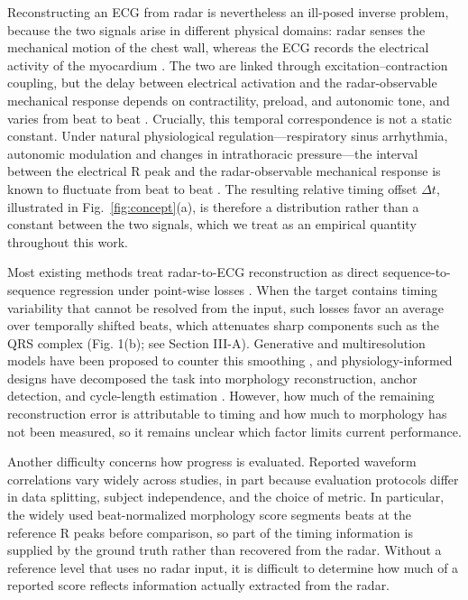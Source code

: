 \documentclass[lettersize,journal]{IEEEtran}
\begin{document}
Reconstructing an ECG from radar is nevertheless an ill-posed inverse problem, because the two signals arise in different physical domains: radar senses the mechanical motion of the chest wall, whereas the ECG records the electrical activity of the myocardium \cite{chenmmwave,radarode}. The two are linked through excitation–contraction coupling, but the delay between electrical activation and the radar-observable mechanical response depends on contractility, preload, and autonomic tone, and varies from beat to beat \cite{michael2017sti}. Crucially, this temporal correspondence is not a static constant. Under natural physiological regulation---respiratory sinus arrhythmia, autonomic modulation and changes in intrathoracic pressure---the interval between the electrical R peak and the radar-observable mechanical response is known to fluctuate from beat to beat \cite{draghici2016hrv,michael2017sti}. The resulting relative timing offset $\Delta t$, illustrated in Fig.~\ref{fig:concept}(a), is therefore a distribution rather than a constant between the two signals, which we treat as an empirical quantity throughout this work.


Most existing methods treat radar-to-ECG reconstruction as direct sequence-to-sequence regression under point-wise losses \cite{chenmmwave,kimEndtoendElectrocardiogramSignal2024,cross-modalautoencoder,S2SA}. When the target contains timing variability that cannot be resolved from the input, such losses favor an average over temporally shifted beats, which attenuates sharp components such as the QRS complex (Fig. 1(b); see Section III-A). Generative and multiresolution models have been proposed to counter this smoothing \cite{ecglikegan,ecgdiff,lifwavnet,xu2025wavegrunet}, and physiology-informed designs have decomposed the task into morphology reconstruction, anchor detection, and cycle-length estimation \cite{radarode,radarodemt}. However, how much of the remaining reconstruction error is attributable to timing and how much to morphology has not been measured, so it remains unclear which factor limits current performance.

Another difficulty concerns how progress is evaluated. Reported waveform correlations vary widely across studies, in part because evaluation protocols differ in data splitting, subject independence, and the choice of metric. In particular, the widely used beat-normalized morphology score segments beats at the reference R peaks before comparison, so part of the timing information is supplied by the ground truth rather than recovered from the radar. Without a reference level that uses no radar input, it is difficult to determine how much of a reported score reflects information actually extracted from the radar.
\end{document}
